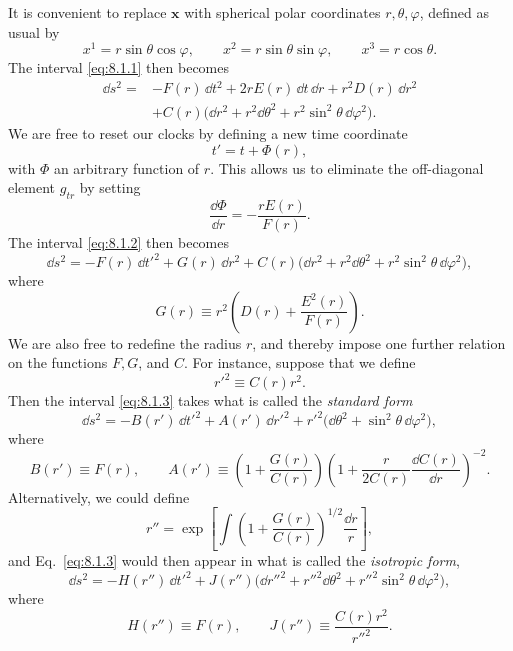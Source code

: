 It is convenient to replace \(\mathbf{x}\) with spherical polar coordinates
\(r,\theta,\varphi\), defined as usual by
\[
  x^1=r\sin\theta\cos\varphi,\qquad
  x^2=r\sin\theta\sin\varphi,\qquad
  x^3=r\cos\theta.
\]
The interval \eqref{eq:8.1.1} then becomes
\begin{equation}
  \begin{split}
  \dd s^2={}&-F(r)\,\dd t^2+2rE(r)\,\dd t\,\dd r+r^2D(r)\,\dd r^2\\
  &+C(r)\bigl(\dd r^2+r^2\dd\theta^2
  +r^2\sin^2\theta\,\dd\varphi^2\bigr).
  \end{split}
  \tag{8.1.2}\label{eq:8.1.2}
\end{equation}
We are free to reset our clocks by defining a new time coordinate
\[
  t'=t+\Phi(r),
\]
with \(\Phi\) an arbitrary function of \(r\). This allows us to eliminate the
off-diagonal element \(g_{tr}\) by setting
\[
  \frac{\dd\Phi}{\dd r}=-\frac{rE(r)}{F(r)}.
\]
The interval \eqref{eq:8.1.2} then becomes
\begin{equation}
  \dd s^2
  =
  -F(r)\,\dd t'^2+G(r)\,\dd r^2
  +C(r)\bigl(\dd r^2+r^2\dd\theta^2+r^2\sin^2\theta\,\dd\varphi^2\bigr),
  \tag{8.1.3}\label{eq:8.1.3}
\end{equation}
where
\[
  G(r)\equiv r^2\left(D(r)+\frac{E^2(r)}{F(r)}\right).
\]
We are also free to redefine the radius \(r\), and thereby impose one
further relation on the functions \(F,G\), and \(C\). For instance, suppose
that we define
\[
  r'^2\equiv C(r)r^2.
\]
Then the interval \eqref{eq:8.1.3} takes what is called the
\emph{standard form}
\begin{equation}
  \dd s^2
  =
  -B(r')\,\dd t'^2+A(r')\,\dd r'^2
  +r'^2\bigl(\dd\theta^2+\sin^2\theta\,\dd\varphi^2\bigr),
  \tag{8.1.4}\label{eq:8.1.4}
\end{equation}
where
\[
  B(r')\equiv F(r),
  \qquad
  A(r')
  \equiv
  \left(1+\frac{G(r)}{C(r)}\right)
  \left(1+\frac{r}{2C(r)}\frac{\dd C(r)}{\dd r}\right)^{-2}.
\]
Alternatively, we could define
\[
  r''
  =
  \exp\left[
    \int
    \left(1+\frac{G(r)}{C(r)}\right)^{1/2}\frac{\dd r}{r}
  \right],
\]
and Eq.~\eqref{eq:8.1.3} would then appear in what is called the
\emph{isotropic form},
\begin{equation}
  \dd s^2
  =
  -H(r'')\,\dd t'^2
  +J(r'')\bigl(\dd r''^2+r''^2\dd\theta^2
  +r''^2\sin^2\theta\,\dd\varphi^2\bigr),
  \tag{8.1.5}\label{eq:8.1.5}
\end{equation}
where
\[
  H(r'')\equiv F(r),
  \qquad
  J(r'')\equiv\frac{C(r)r^2}{r''^2}.
\]

